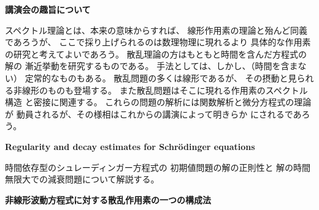 \documentclass[uplatex,dvipdfmx]{jlreq}
\begin{document}
\begin{center}
{\large\bfseries 講演会の趣旨について}\\[6pt]
\hspace*{\fill}{\large\bfseries 池部 晃生}
\end{center}
\vspace{6pt}

スペクトル理論とは、本来の意味からすれば、
線形作用素の理論と殆んど同義であろうが、
ここで採り上げられるのは数理物理に現れるより
具体的な作用素の研究と考えてよいであろう。
散乱理論の方はもともと時間を含んだ方程式の解の
漸近挙動を研究するものである。
手法としては、しかし、（時間を含まない）
定常的なものもある。
散乱問題の多くは線形であるが、
その摂動と見られる非線形のものも登場する。
また散乱問題はそこに現れる作用素のスペクトル構造
と密接に関連する。
これらの問題の解析には関数解析と微分方程式の理論が
動員されるが、その様相はこれからの講演によって明きらか
にされるであろう。

\newpage

\begin{center}
{\large\bfseries Regularity and decay estimates for
Schr\"odinger equations}\\[6pt]
\hspace*{\fill}{\large\bfseries 谷島 賢二\ (学習院大・理)}
\end{center}
\vspace{6pt}

時間依存型のシュレーディンガー方程式の
初期値問題の解の正則性と
解の時間無限大での減衰問題について解説する。

\newpage

\begin{center}
{\large\bfseries 非線形波動方程式に対する散乱作用素の一つの構成法}\\[6pt]
\hspace*{\fill}{\large\bfseries 久保 英夫\ (大阪大学大学院理学研究科)}
\end{center}
\end{document}
